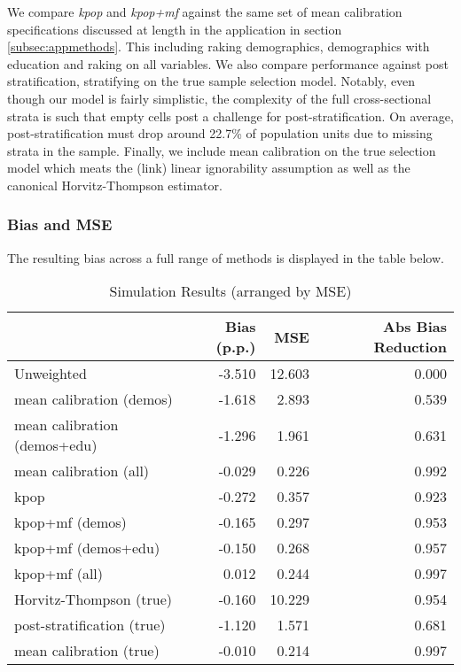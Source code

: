 \documentclass[
]{article}
\begin{document}
We compare \textit{kpop} and \textit{kpop+mf} against the same set of
mean calibration specifications discussed at length in the application
in section \ref{subsec:appmethods}. This including raking demographics,
demographics with education and raking on all variables. We also compare
performance against post stratification, stratifying on the true sample
selection model. Notably, even though our model is fairly simplistic,
the complexity of the full cross-sectional strata is such that empty
cells post a challenge for post-stratification. On average,
post-stratification must drop around 22.7\% of population units due to
missing strata in the sample. Finally, we include mean calibration on
the true selection model which meats the (link) linear ignorability
assumption as well as the canonical Horvitz-Thompson estimator.

\hypertarget{bias-and-mse}{%
\subsubsection{Bias and MSE}\label{bias-and-mse}}

The resulting bias across a full range of methods is displayed in the
table below.

\begin{table}[!h]

\caption{\label{tab:non_lin_res_race_r55_inter}Simulation Results (arranged by MSE)}
\centering
\begin{tabular}[t]{lrrr}
\toprule
  & Bias (p.p.) & MSE & Abs Bias Reduction\\
\midrule
Unweighted & -3.510 & 12.603 & 0.000\\
mean calibration (demos) & -1.618 & 2.893 & 0.539\\
mean calibration (demos+edu) & -1.296 & 1.961 & 0.631\\
mean calibration (all) & -0.029 & 0.226 & 0.992\\
kpop & -0.272 & 0.357 & 0.923\\
\addlinespace
kpop+mf (demos) & -0.165 & 0.297 & 0.953\\
kpop+mf (demos+edu) & -0.150 & 0.268 & 0.957\\
kpop+mf (all) & 0.012 & 0.244 & 0.997\\
Horvitz-Thompson (true) & -0.160 & 10.229 & 0.954\\
post-stratification (true) & -1.120 & 1.571 & 0.681\\
\addlinespace
mean calibration (true) & -0.010 & 0.214 & 0.997\\
\bottomrule
\end{tabular}
\end{table}
\end{document}
